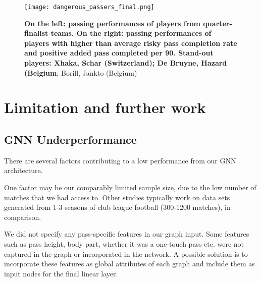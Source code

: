 \documentclass[conference]{IEEEtran}
\begin{document}
\begin{figure*}[htbp]

\centerline{\texttt{[image: dangerous\_passers\_final.png]}}
\caption{\textbf{On the left: passing performances of players from quarter-finalist teams. On the right: passing performances of players with higher than average risky pass completion rate and positive added pass completed per 90. Stand-out players: Xhaka, Schar (Switzerland); De Bruyne, Hazard (Belgium}; Borill, Jankto (Belgium)}
\label{dangerous_pass}
\end{figure*}






\section{Limitation and further work}


\subsection{GNN Underperformance} \label{limitation}

There are several factors contributing to a low performance from our GNN architecture.

One factor may be our comparably limited sample size, due to the low number of matches that we had access to. Other studies typically work on data sets generated from 1-3 seasons of club league football (300-1200 matches), in comparison.

We did not specify any pass-specific features in our graph input. Some features such as pass height, body part, whether it was a one-touch pass etc. were not captured in the graph or incorporated in the network. A possible solution is to incorporate these features as global attributes of each graph and include them as input nodes for the final linear layer.
\end{document}
